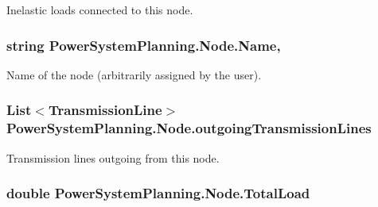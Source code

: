 Inelastic loads connected to this node. 

\subsubsection[{\texorpdfstring{Name}{Name}}]{\setlength{\rightskip}{0pt plus 5cm}string Power\+System\+Planning.\+Node.\+Name\hspace{0.3cm}{\ttfamily [get]}, {\ttfamily [set]}}\hypertarget{class_power_system_planning_1_1_node_ac793185992fc6c55ca5e1880f4947e57}{}\label{class_power_system_planning_1_1_node_ac793185992fc6c55ca5e1880f4947e57}


Name of the node (arbitrarily assigned by the user). 

\subsubsection[{\texorpdfstring{outgoing\+Transmission\+Lines}{outgoingTransmissionLines}}]{\setlength{\rightskip}{0pt plus 5cm}List$<${\bf Transmission\+Line}$>$ Power\+System\+Planning.\+Node.\+outgoing\+Transmission\+Lines\hspace{0.3cm}{\ttfamily [get]}}\hypertarget{class_power_system_planning_1_1_node_a7b48ca310aba50314020d2ac1ea071f9}{}\label{class_power_system_planning_1_1_node_a7b48ca310aba50314020d2ac1ea071f9}


Transmission lines outgoing from this node. 

\subsubsection[{\texorpdfstring{Total\+Load}{TotalLoad}}]{\setlength{\rightskip}{0pt plus 5cm}double Power\+System\+Planning.\+Node.\+Total\+Load\hspace{0.3cm}{\ttfamily [get]}}\hypertarget{class_power_system_planning_1_1_node_a5ad80ac9ed391e904c9cf4011c7ba00d}{}\label{class_power_system_planning_1_1_node_a5ad80ac9ed391e904c9cf4011c7ba00d}


